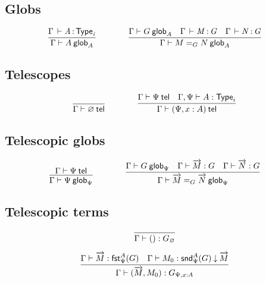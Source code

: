 \subsection{Globs}

\begin{small}
  \[
  \infer{\wfglob{\Gamma}{A}{A}}
  {\oftp{\Gamma}{A}{\typ{i}}}
  \qquad\qquad
  \infer{\wfglob{\Gamma}{\homj{G}{M}{N}}{A}}
  {\wfglob{\Gamma}{G}{A} &
    \oftp{\Gamma}{M}{G} &
    \oftp{\Gamma}{N}{G}
  }
  \]
\end{small}

\subsection{Telescopes}

\begin{small}
  \[
  \infer{\wftel{\Gamma}{\varnothing}}{}
  \qquad\qquad
  \infer{\wftel{\Gamma}{(\Psi,x:A)}}
  {\wftel{\Gamma}{\Psi}
    & \wftype{\Gamma,\Psi}{A}}
  \]
\end{small}

\subsection{Telescopic globs}

\begin{small}
  \[
  \infer{\wfglob{\Gamma}{\Psi}{\Psi}}
  {\wftel{\Gamma}{\Psi}}
  \qquad\qquad
  \infer{\wfglob{\Gamma}{\homj{G}{\tel{M}}{\tel{N}}}{\Psi}}
  {\wfglob{\Gamma}{G}{\Psi}
    & \ofglob{\Gamma}{\tel{M}}{G}
    & \ofglob{\Gamma}{\tel{N}}{G}}
  \]
\end{small}

\subsection{Telescopic terms}

\begin{small}
  \[
  \infer{\ofglob{\Gamma}{()}{G_\varnothing}}{}
  \]

  \[
  \infer{\ofglob{\Gamma}{(\tel{M},M_0)}{G_{\Psi,x:A}}}
  {\ofglob{\Gamma}{\tel M}{\fsttelglob{\Psi}{A}{G}}
    & \ofdepglob{\Gamma}{M_0}{\sndtelglob{\Psi}{A}{G}}{\tel M}}
  \]
\end{small}

